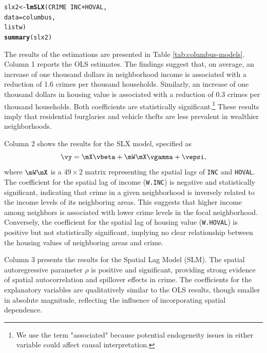 \documentclass[english,12pt]{book}\usepackage[]{graphicx}\usepackage[]{xcolor}
\makeatletter
\newcommand{\hlopt}[1]{\textcolor[rgb]{0,0,0}{#1}}%
\newcommand{\hlstd}[1]{\textcolor[rgb]{0.345,0.345,0.345}{#1}}%
\newcommand{\hlkwb}[1]{\textcolor[rgb]{0.69,0.353,0.396}{#1}}%
\newcommand{\hlkwc}[1]{\textcolor[rgb]{0.333,0.667,0.333}{#1}}%
\newcommand{\hlkwd}[1]{\textcolor[rgb]{0.737,0.353,0.396}{\textbf{#1}}}%
\newenvironment{kframe}{%
 \def\at@end@of@kframe{}%
 \ifinner\ifhmode%
  \def\at@end@of@kframe{\end{minipage}}%
  \begin{minipage}{\columnwidth}%
 \fi\fi%
 \def\FrameCommand##1{\hskip\@totalleftmargin \hskip-\fboxsep
 \colorbox{shadecolor}{##1}\hskip-\fboxsep
     \hskip-\linewidth \hskip-\@totalleftmargin \hskip\columnwidth}%
 \MakeFramed {\advance\hsize-\width
   \@totalleftmargin\z@ \linewidth\hsize
   \@setminipage}}%
 {\par\unskip\endMakeFramed%
 \at@end@of@kframe}
\newenvironment{knitrout}{}{} %
\makeatother
\begin{document}
\begin{knitrout}
\color{fgcolor}\begin{kframe}
\begin{alltt}
\hlstd{slx2} \hlkwb{<-} \hlkwd{lmSLX}\hlstd{(CRIME} \hlopt{~} \hlstd{INC} \hlopt{+} \hlstd{HOVAL,}
              \hlkwc{data} \hlstd{= columbus,}
              \hlstd{listw)}
\hlkwd{summary}\hlstd{(slx2)}
\end{alltt}
\end{kframe}
\end{knitrout}


The results of the estimations are presented in Table \ref{tab:columbus-models}. Column 1 reports the OLS estimates. The findings suggest that, on average, an increase of one thousand dollars in neighborhood income is associated with a reduction of 1.6 crimes per thousand households. Similarly, an increase of one thousand dollars in housing value is associated with a reduction of 0.3 crimes per thousand households. Both coefficients are statistically significant.\footnote{We use the term "associated" because potential endogeneity issues in either variable could affect causal interpretation.} These results imply that residential burglaries and vehicle thefts are less prevalent in wealthier neighborhoods.

Column 2 shows the results for the SLX model, specified as 
\[
\vy = \mX\vbeta + \mW\mX\vgamma + \vepsi,
\]
where \(\mW\mX\) is a \(49 \times 2\) matrix representing the spatial lags of \texttt{INC} and \texttt{HOVAL}. The coefficient for the spatial lag of income (\texttt{W.INC}) is negative and statistically significant, indicating that crime in a given neighborhood is inversely related to the income levels of its neighboring areas. This suggests that higher income among neighbors is associated with lower crime levels in the focal neighborhood. Conversely, the coefficient for the spatial lag of housing value (\texttt{W.HOVAL}) is positive but not statistically significant, implying no clear relationship between the housing values of neighboring areas and crime.

Column 3 presents the results for the Spatial Lag Model (SLM). The spatial autoregressive parameter \(\rho\) is positive and significant, providing strong evidence of spatial autocorrelation and spillover effects in crime. The coefficients for the explanatory variables are qualitatively similar to the OLS results, though smaller in absolute magnitude, reflecting the influence of incorporating spatial dependence.
\end{document}
